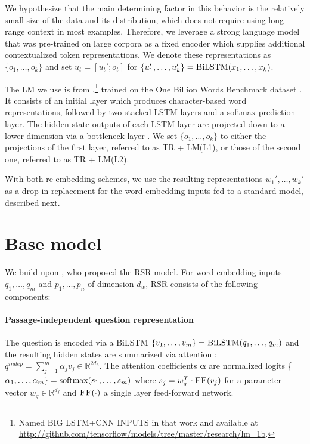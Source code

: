 \documentclass[11pt,a4paper]{article}
\newcommand{\lstm}{\textsc{LSTM}}
\newcommand{\rasor}{\textsc{R\normalfont{a}S\normalfont{o}R}}
\newcommand{\tr}{\textsc{TR}}
\newcommand{\trLmLi}{\tr{} + LM(L1)}
\newcommand{\trLmLii}{\tr{} + LM(L2)}
\begin{document}
We hypothesize that the main determining factor in this behavior is the relatively small size of the data and its distribution, which does not require using long-range context in most examples. Therefore, we leverage a strong language model that was pre-trained on large corpora as a fixed encoder which supplies additional contextualized token representations. We denote these representations as $\{o_1,\dots,o_k\}$ and set $u_t=[u_t';o_t]$ for $\{u_1',\dots,u_k'\}=\textsc{B\normalfont{i}LSTM}(x_1,\dots,x_k)$.

The LM we use is from \citet{jozefowicz2016},\footnote{Named \textsc{BIG LSTM+CNN INPUTS} in that work and available at \small{\url{http://github.com/tensorflow/models/tree/master/research/lm_1b}}.} trained on the One Billion Words Benchmark dataset \cite{DBLP:journals/corr/ChelbaMSGBK13}. It consists of an initial layer which produces character-based word representations, followed by two stacked \lstm{} layers and a softmax prediction layer. The hidden state outputs of each \lstm{} layer are projected down to a lower dimension via a bottleneck layer \cite{sak2014}. We set $\{o_1,\dots,o_k\}$ to either the projections of the first layer, referred to as \trLmLi{}, or those of the second one, referred to as \trLmLii{}.

With both re-embedding schemes, we use the resulting representations $w_1',\dots,w_k'$ as a drop-in replacement for the word-embedding inputs fed to a standard model, described next.
 
\section{Base model}
\label{sec:base_model}

We build upon \citet{lee2016}, who proposed the \rasor{} model. For word-embedding inputs $q_1,\dots,q_m$ and $p_1,\dots,p_n$ of dimension ${d_w}$, \rasor{} consists of the following components:

\paragraph{Passage-independent question representation}
The question is encoded via a BiLSTM $\{v_1,\dots,v_m\}=\textsc{B\normalfont{i}LSTM}(q_1,\dots,q_m)$ and the resulting hidden states are summarized via attention \citep{bahdanau2014,DBLP:conf/emnlp/ParikhT0U16}: $q^{indep}=\sum_{j=1}^{m} \alpha_{j} v_j\in\mathbb{R}^{2d_h}$.
The attention coefficients $\mathbf{\alpha}$ are normalized logits \{$\alpha_1,\dots,\alpha_m\}=\textsc{\normalfont{softmax}}(s_1,\dots,s_m)$ where $s_j=w_q^T \cdot \textsc{FF}(v_j)$ for a parameter vector $w_q\in\mathbb{R}^{d_f}$ and $\textsc{FF}(\cdot)$ a single layer feed-forward network.
\end{document}
